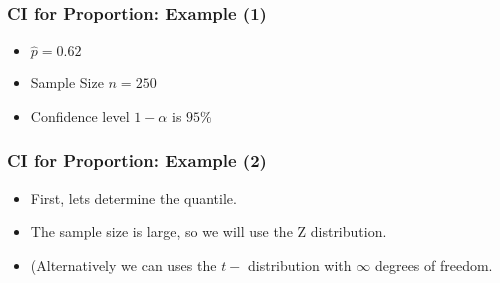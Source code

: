 

\begin{frame}
\frametitle{CI for Proportion: Example (1)}

\begin{itemize}
\item $\hat{p}  = 0.62$
\item Sample Size $n=250$
\item Confidence level $1-\alpha$ is $95\%$
\end{itemize}

\end{frame}

\begin{frame}\frametitle{CI for Proportion: Example (2)}

\begin{itemize}
\item First, lets determine the quantile.
\item The sample size is large, so we will use the Z distribution.
\item (Alternatively we can uses the $t-$ distribution with $\infty$ degrees of freedom.
\end{itemize}

\end{frame}


